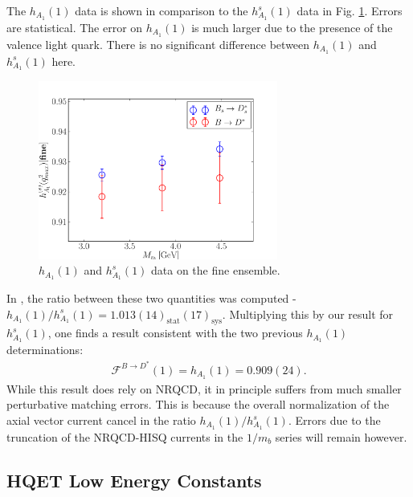 The $h_{A_1}(1)$ data is shown in comparison to the $h_{A_1}^s(1)$ data in Fig. \ref{fig:BDstar_BsDsstar}. Errors are statistical. The error on $h_{A_1}(1)$ is much larger due to the presence of the valence light quark. There is no significant difference between $h_{A_1}(1)$ and $h_{A_1}^s(1)$ here.

\begin{figure}[htb!]
  \begin{center}
  \hspace{-10pt}
  \includegraphics[width=0.7\textwidth]{images/BsDsstar/BD_BsDs.pdf}
  \caption{$h_{A_1}(1)$ and $h_{A_1}^s(1)$ data on the fine ensemble.\label{fig:BDstar_BsDsstar}}
  \end{center}
\end{figure}

In \cite{Harrison:2017fmw}, the ratio between these two quantities was computed - $h_{A_1}(1) / h^s_{A_1}(1) = 1.013(14)_{\text{stat}}(17)_{\text{sys}}$. Multiplying this by our result for $h^s_{A_1}(1)$, one finds a result consistent with the two previous $h_{A_1}(1)$ determinations:
\begin{align}
  \mathcal{F}^{B\to D^*}(1) = h_{A_1}(1) = 0.909(24).
  \label{eq:hA1_us_nrqcd}
\end{align}
While this result does rely on NRQCD, it in principle suffers from much smaller perturbative matching errors. This is because the overall normalization of the axial vector current cancel in the ratio $h_{A_1}(1) / h^s_{A_1}(1)$. Errors due to the truncation of the NRQCD-HISQ currents in the $1/m_b$ series will remain however.

\subsection{HQET Low Energy Constants}

